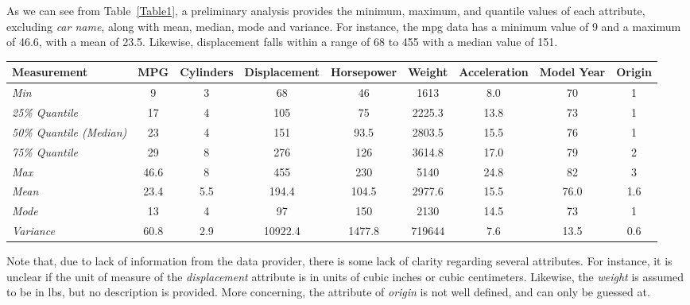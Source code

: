 \documentclass[10pt, conference, compsocconf]{IEEEtran}
\begin{document}
As we can see from Table~\ref{Table1}, a preliminary analysis provides the minimum, maximum, and quantile values of each attribute, excluding \textit{car name}, along with mean, median, mode and variance. For instance, the mpg data has a minimum value of 9 and a maximum of 46.6, with a mean of 23.5. Likewise, displacement falls within a range of 68 to 455 with a median value of 151.
\begin{center}
	\begin{table*}[!]
		\centering \footnotesize
		\vspace{0.01cm}
		\caption{Grid Search Parameters}
		\hspace{1cm}
		\begin{tabular}{| l | c | c | c | c | c | c | c | c |}
			\hline
			\textbf{Measurement} & \textbf{MPG}	& \textbf{Cylinders}	& \textbf{Displacement}	& \textbf{Horsepower}& 	\textbf{Weight}	& \textbf{Acceleration}	& \textbf{Model Year}	& \textbf{Origin} \\ \hline
			
			\textit{Min} & 9 &	3 &	68 &	46 &	1613 &	8.0 &	70 &	1 \\ \hline
			\textit{25\% Quantile} & 17 &	4 &	105 &	75 &	2225.3 &	13.8 &	73 &	1 \\ \hline
			\textit{50\% Quantile (Median)} & 23 &	4 &	151 &	93.5 &	2803.5 &	15.5 &	76 &	1 \\ \hline
			\textit{75\% Quantile} & 29 &	8 &	276 &	126 &	3614.8 &	17.0 &	79 &	2 \\ \hline
			\textit{Max} & 46.6 &	8 &	455 &	230 &	5140 &	24.8 &	82 &	3 \\ \hline
			\textit{Mean} & 23.4 &	5.5 &	194.4 &	104.5 & 2977.6 &	15.5 &	76.0 &	1.6 \\ \hline
			\textit{Mode} & 	13 &	4 &	97 &	150 &	2130 &	14.5 &	73 &	1 \\ \hline
			\textit{Variance} & 60.8 &	2.9 &	10922.4 &	1477.8 &	719644 &	7.6 &	13.5 &	0.6 \\ \hline
		\end{tabular}\newline
		\vspace{-0.05cm}
		\label{Table1}
	\end{table*} \hfil
\end{center}

Note that, due to lack of information from the data provider, there is some lack of clarity regarding several attributes. For instance, it is unclear if the unit of measure of the \textit{displacement} attribute is in units of cubic inches or cubic centimeters. Likewise, the \textit{weight} is assumed to be in lbs, but no description is provided. More concerning, the attribute of \textit{origin} is not well defined, and can only be guessed at.  
\end{document}
